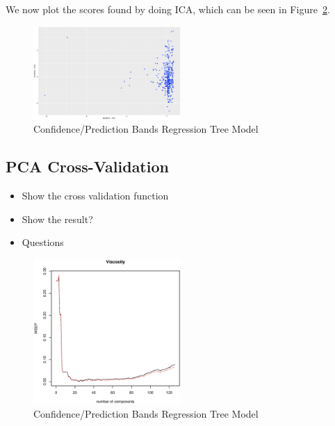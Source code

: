 \documentclass[a4paper, twocolumn]{article}
\begin{document}
        We now plot the scores found by doing ICA, which can be seen in Figure~\ref{fig:icascores}.

        \begin{figure}[h!]
            \centering
            \caption{Confidence/Prediction Bands Regression Tree Model}
            \label{fig:icascores}
            \includegraphics[width=0.5\textwidth]{share/A2_icascore.eps}
        \end{figure}

    \subsection*{PCA Cross-Validation}

        \begin{itemize}
            \item Show the cross validation function
            \item Show the result?
            \item Questions
        \end{itemize}

        \begin{figure}[h!]
            \centering
            \caption{Confidence/Prediction Bands Regression Tree Model}
            \label{fig:icascores}
            \includegraphics[width=0.5\textwidth]{share/A2_viscosity.eps}
        \end{figure}
\end{document}
